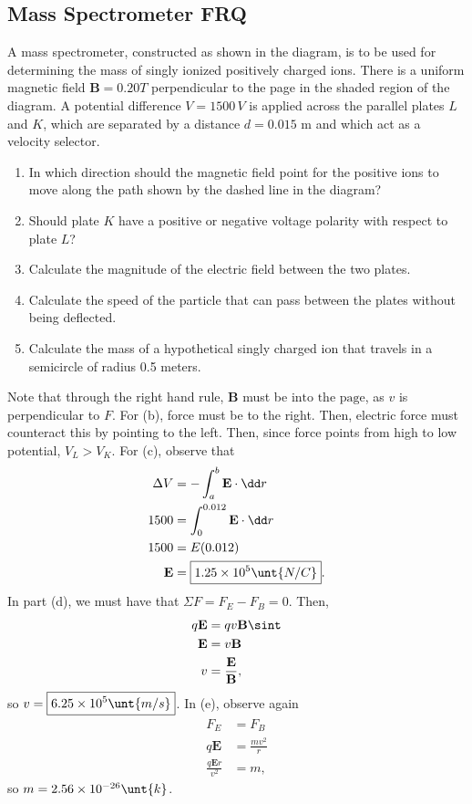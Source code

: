 \documentclass[11pt]{article}
\begin{document}
\subsection{Mass Spectrometer FRQ}
\begin{example}[AP 1993 \#3]
    A mass spectrometer, constructed as shown in the diagram, is to be used for determining the mass of singly ionized positively charged ions. There is a uniform magnetic field $\mathbf{B} = 0.20 T$ perpendicular to the page in the shaded region of the diagram. A potential difference $V = 1500\, V$ is applied across the parallel plates $L$ and $K$, which are separated by a distance $d = 0.015$ m and which act as a velocity selector.
    \begin{enumerate}[label=(\alph*)]
        \item In which direction should the magnetic field point for the positive ions to move along the path shown by the dashed line in the diagram?
        \item Should plate $K$ have a positive or negative voltage polarity with respect to plate $L$?
        \item Calculate the magnitude of the electric field between the two plates.
        \item Calculate the speed of the particle that can pass between the plates without being deflected.
        \item Calculate the mass of a hypothetical singly charged ion that travels in a semicircle of radius 0.5 meters.
    \end{enumerate}
\end{example}
\begin{solution}
    Note that through the right hand rule, $\mathbf{B}$ must be $\boxed{\text{into the page}}$, as $v$ is perpendicular to $F$. For (b), force must be to the right. Then, electric force must counteract this by pointing to the left. Then, since force points from high to low potential, $\boxed{V_L > V_K}$. For (c), observe that
    \begin{align*}
        \Delta V &= -\int_a^b \mathbf{E}\cdot \dd r \\
        1500 &= \int_0^{0.012} \mathbf{E}\cdot \dd r \\
        1500 &= E(0.012) \\
        \mathbf{E} &= \boxed{1.25 \times 10^{5} \unt{N/C}}.
    \end{align*}
    In part (d), we must have that $\Sigma F = F_E - F_B = 0$. Then,
    \begin{align*}
        q\mathbf{E} &= qv\mathbf{B}\sint \\
        \mathbf{E} &= v\mathbf{B} \\
        v &= \frac{\mathbf{E}}{\mathbf{B}},
    \end{align*}
    so $v = \boxed{6.25\times 10^5\unt{m/s}}$. In (e), observe again
    \begin{align*}
        F_E &= F_B \\
        q\mathbf{E} &= \frac{mv^2}{r} \\
        \frac{q\mathbf{E}r}{v^2} &= m,
    \end{align*}
    so $m = 2.56 \times 10^{-26}\unt{k}$.
\end{solution}
\end{document}
